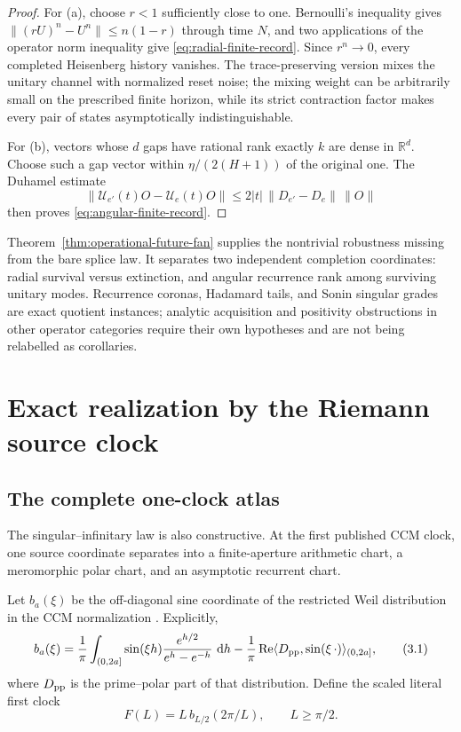 \documentclass[11pt]{article}
\theoremstyle{definition}
\theoremstyle{remark}
\newcommand{\R}{\mathbb R}
\newcommand{\Rea}{\operatorname{Re}}
\newcommand{\dd}{\,\mathrm d}
\begin{document}
\begin{proof}
For \textup{(a)}, choose $r<1$ sufficiently close to one.  Bernoulli's inequality gives
$\|(rU)^n-U^n\|\le n(1-r)$ through time $N$, and two applications of the operator norm inequality
give \eqref{eq:radial-finite-record}.  Since $r^n\to0$, every completed Heisenberg history
vanishes.  The trace-preserving version mixes the unitary channel with normalized reset noise;
the mixing weight can be arbitrarily small on the prescribed finite horizon, while its strict
contraction factor makes every pair of states asymptotically indistinguishable.

For \textup{(b)}, vectors whose $d$ gaps have rational rank exactly $k$ are dense in $\R^d$.
Choose such a gap vector within $\eta/(2(H+1))$ of the original one.  The Duhamel estimate
\[
 \|\mathcal U_{e'}(t)O-\mathcal U_e(t)O\|
 \le2|t|\,\|D_{e'}-D_e\|\,\|O\|
\]
then proves \eqref{eq:angular-finite-record}.
\end{proof}

Theorem~\ref{thm:operational-future-fan} supplies the nontrivial robustness missing from the bare
splice law.  It separates two independent completion coordinates: radial survival versus
extinction, and angular recurrence rank among surviving unitary modes.  Recurrence coronas,
Hadamard tails, and Sonin singular grades are exact quotient instances; analytic acquisition and
positivity obstructions in other operator categories require their own hypotheses and are not
being relabelled as corollaries.


\section{Exact realization by the Riemann source clock}\label{sec:interpretation}

\subsection{The complete one-clock atlas}

The singular--infinitary law is also constructive.  At the first published CCM clock, one
source coordinate separates into a finite-aperture arithmetic chart, a meromorphic polar chart,
and an asymptotic recurrent chart.

Let $b_a(\xi)$ be the off-diagonal sine coordinate of the restricted Weil distribution in the
CCM normalization \cite{ConnesConsaniMoscovici2025}.  Explicitly,
\[
 b_a(\xi)=\frac1\pi\int_{(0,2a]}
 \sin(\xi h)\frac{e^{h/2}}{e^h-e^{-h}}\,\dd h
 -\frac1\pi\Rea\langle D_{\rm pp},\sin(\xi\,\cdot)\rangle_{(0,2a]},
 \tag{3.1}\label{eq:ccm-source-coordinate}
\]
where $D_{\rm pp}$ is the prime--polar part of that distribution.  Define the scaled literal
first clock
\[
 F(L)=L\,b_{L/2}(2\pi/L),\qquad L\ge\pi/2.
 \tag{3.2}\label{eq:scaled-first-clock}
\]
\end{document}
